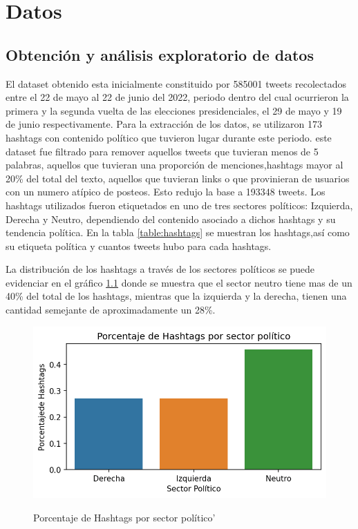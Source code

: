 \chapter{Datos}

\section{Obtención y análisis exploratorio de datos}

El dataset obtenido esta inicialmente constituido por 585001 tweets recolectados entre el 22 de mayo al 22 de junio del 2022, periodo dentro del cual ocurrieron la primera y la segunda vuelta de las elecciones presidenciales, el 29 de mayo y 19 de junio respectivamente. Para la extracción de los datos, se utilizaron 173 hashtags con contenido político que tuvieron lugar durante este periodo. este dataset fue filtrado para remover aquellos tweets que tuvieran menos de 5 palabras, aquellos que tuvieran una proporción de menciones,hashtags mayor al 20\% del total del texto, aquellos que tuvieran links o que provinieran de usuarios con un numero atípico de posteos. Esto redujo la base a 193348 tweets.  Los hashtags utilizados fueron etiquetados en uno de tres sectores políticos: Izquierda, Derecha y Neutro, dependiendo del contenido asociado a dichos hashtags y su tendencia política. En la tabla \ref{table:hashtags} se muestran los hashtags,así como su etiqueta política y cuantos tweets hubo para cada hashtags.

La distribución de los hashtags a través de los sectores políticos se puede evidenciar en el gráfico \ref{figure:tweets_cantidad_hashtags} donde se muestra que el sector neutro tiene mas de un  40\% del total de los hashtags, mientras que la izquierda y la derecha, tienen una cantidad semejante de aproximadamente un 28\%.


\begin{figure}[h]
	\caption{Porcentaje de Hashtags por sector político'}
	\centering
	\includegraphics{../Images/EDA/Cantidad de Hashtags por sector politico.png} 
	\label{figure:tweets_cantidad_hashtags}
\end{figure}

